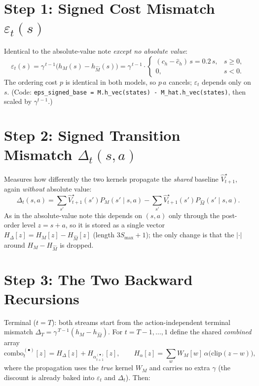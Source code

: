 \documentclass[11pt]{article}
\newcommand{\Smax}{S_{\max}}
\newcommand{\Vhat}{\hat V}
\begin{document}
\section{Step 1: Signed Cost Mismatch $\varepsilon_t(s)$}
Identical to the absolute-value note \emph{except no absolute value}:
\begin{equation}
\varepsilon_t(s)=\gamma^{\,t-1}\bigl(h_M(s)-h_{\hat M}(s)\bigr)
=\gamma^{\,t-1}\cdot
\begin{cases}
(c_h-\hat c_h)\,s = 0.2\,s, & s\ge 0,\\
0, & s<0.
\end{cases}
\label{eq:eps}
\end{equation}
The ordering cost $p$ is identical in both models, so $p\,a$ cancels; $\varepsilon_t$
depends only on $s$. (Code: \texttt{eps\_signed\_base = M.h\_vec(states) -
M\_hat.h\_vec(states)}, then scaled by $\gamma^{t-1}$.)

\section{Step 2: Signed Transition Mismatch $\Delta_t(s,a)$}
Measures how differently the two kernels propagate the \emph{shared} baseline
$\Vhat^\star_{t+1}$, again \emph{without} absolute value:
\begin{equation}
\Delta_t(s,a)=
\sum_{s'}\Vhat^\star_{t+1}(s')P_M(s'\mid s,a)
-\sum_{s'}\Vhat^\star_{t+1}(s')P_{\hat M}(s'\mid s,a).
\label{eq:delta}
\end{equation}
As in the absolute-value note this depends on $(s,a)$ only through the post-order
level $z=s+a$, so it is stored as a single vector
$H_\Delta[z]=H_M[z]-H_{\hat M}[z]$ (length $3\Smax+1$); the only change is that the
$|\cdot|$ around $H_M-H_{\hat M}$ is dropped.

\section{Step 3: The Two Backward Recursions}
Terminal ($t=T$): both streams start from the action-independent terminal mismatch
$\Delta_T=\gamma^{\,T-1}(h_M-h_{\hat M})$. For $t=T-1,\dots,1$ define the shared
\emph{combined} array
\begin{equation}
\mathrm{combo}^{(\bullet)}_t[z]
=H_\Delta[z]+H_{\alpha^{(\bullet)}_{t+1}}[z],
\qquad
H_{\alpha}[z]=\sum_{w}W_M[w]\,\alpha\bigl(\mathrm{clip}(z-w)\bigr),
\label{eq:combo}
\end{equation}
where the propagation uses the \emph{true} kernel $W_M$ and carries no extra
$\gamma$ (the discount is already baked into $\varepsilon_t$ and $\Delta_t$). Then:
\end{document}
